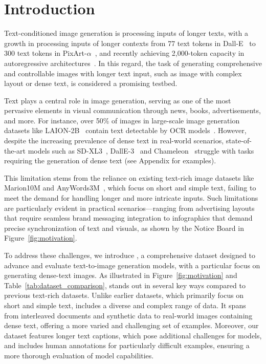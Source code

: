 \section{Introduction}

Text-conditioned image generation is processing inputs of longer texts, with a growth in processing inputs of longer contexts from 77 text tokens in Dall-E~\cite{dalle} to 300 text tokens in PixArt-$\alpha$~\cite{pixarta}, and recently achieving 2,000-token capacity in autoregressive architectures~\cite{chameleon}.
In this regard, the task of generating comprehensive and controllable images with longer text input, such as image with complex layout or dense text, is considered a promising testbed.




Text plays a central role in image generation, serving as one of the most pervasive elements in visual communication through news, books, advertisements, and more. 
For instance, over 50\% of images in large-scale image generation datasets like LAION-2B~\cite{laion} contain text detectable by OCR models~\cite{parrot}. 
However, despite the increasing prevalence of dense text in real-world scenarios, state-of-the-art models such as SD-XL3~\cite{sd3}, DallE-3~\cite{dalle3} and Chameleon~\cite{chameleon} struggle with tasks requiring the generation of dense text (see Appendix for examples). 




This limitation stems from the reliance on existing text-rich image datasets like Marion10M and AnyWords3M~\cite{anytext,textdiffuser2}, which focus on short and simple text, failing to meet the demand for handling longer and more intricate inputs. 
Such limitations are particularly evident in practical scenarios—ranging from advertising layouts that require seamless brand messaging integration to infographics that demand precise synchronization of text and visuals, as shown by the Notice Board in Figure~\ref{fig:motivation}.


To address these challenges, we introduce \DatasetName, a comprehensive dataset designed to advance and evaluate text-to-image generation models, with a particular focus on generating dense-text images. 
As illustrated in Figure~\ref{fig:motivation} and Table~\ref{tab:dataset_comparison}, \DatasetName stands out in several key ways compared to previous text-rich datasets. 
Unlike earlier datasets, which primarily focus on short and simple text, \DatasetName includes a diverse and complex range of data. 
It spans from interleaved documents and synthetic data to real-world images containing dense text, offering a more varied and challenging set of examples. 
Moreover, our dataset features longer text captions, which pose additional challenges for models, and includes human annotations for particularly difficult examples, ensuring a more thorough evaluation of model capabilities.

